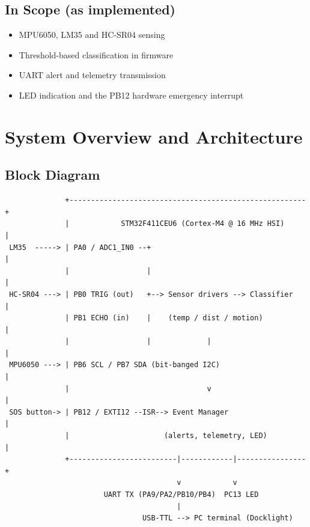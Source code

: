 \documentclass[11pt,a4paper]{article}
\begin{document}
\subsection{In Scope (as implemented)}
\begin{itemize}
  \item MPU6050, LM35 and HC-SR04 sensing
  \item Threshold-based classification in firmware
  \item UART alert and telemetry transmission
  \item LED indication and the PB12 hardware emergency interrupt
\end{itemize}

\section{System Overview and Architecture}
\subsection{Block Diagram}
\begin{lstlisting}
              +-------------------------------------------------------+
              |            STM32F411CEU6 (Cortex-M4 @ 16 MHz HSI)     |
 LM35  -----> | PA0 / ADC1_IN0 --+                                    |
              |                  |                                    |
 HC-SR04 ---> | PB0 TRIG (out)   +--> Sensor drivers --> Classifier   |
              | PB1 ECHO (in)    |    (temp / dist / motion)          |
              |                  |             |                      |
 MPU6050 ---> | PB6 SCL / PB7 SDA (bit-banged I2C)                    |
              |                                v                      |
 SOS button-> | PB12 / EXTI12 --ISR--> Event Manager                  |
              |                      (alerts, telemetry, LED)         |
              +-------------------------|------------|----------------+
                                        v            v
                       UART TX (PA9/PA2/PB10/PB4)  PC13 LED
                                        |
                                USB-TTL --> PC terminal (Docklight)
\end{lstlisting}
\end{document}

